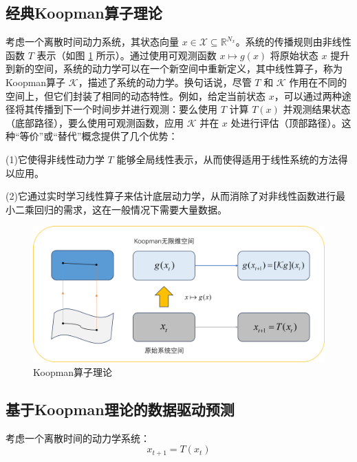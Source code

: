 \documentclass[lang=chs, degree=master, blindreview=false, winfonts=true]{yanputhesis}
\begin{document}
\subsection{经典Koopman算子理论}

考虑一个离散时间动力系统，其状态向量 \( x \in \mathcal{X} \subseteq \mathbb{R}^{N_x} \)。系统的传播规则由非线性函数 \( T \) 表示（如图 \ref{3_1} 所示）。通过使用可观测函数 \( x \mapsto g(x) \) 将原始状态 \( x \) 提升到新的空间，系统的动力学可以在一个新空间中重新定义，其中线性算子，称为Koopman算子 \( \mathcal{K} \)，描述了系统的动力学。换句话说，尽管 \( T \) 和 \( \mathcal{K} \) 作用在不同的空间上，但它们封装了相同的动态特性。例如，给定当前状态 \( x \)，可以通过两种途径将其传播到下一个时间步并进行观测：要么使用 \( T \) 计算 \( T(x) \) 并观测结果状态（底部路径），要么使用可观测函数，应用 \( \mathcal{K} \) 并在 \( x \) 处进行评估（顶部路径）。这种“等价”或“替代”概念提供了几个优势：

(1)它使得非线性动力学 \( T \) 能够全局线性表示，从而使得适用于线性系统的方法得以应用。

(2)它通过实时学习线性算子来估计底层动力学，从而消除了对非线性函数进行最小二乘回归的需求，这在一般情况下需要大量数据。
\begin{figure}[hbt!]
	\centering
	\includegraphics[width=28pc]{picture/3_1.png} 
	\caption{Koopman算子理论} \label{3_1}
\end{figure}
\subsection{基于Koopman理论的数据驱动预测}

考虑一个离散时间的动力学系统：
\begin{equation}
	x_{t+1} = T(x_t)\label{3-2}
\end{equation}
\end{document}
